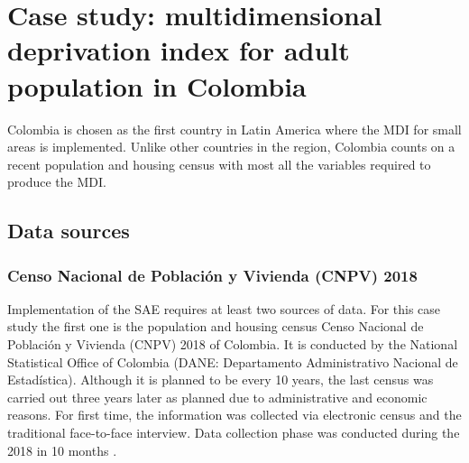 \documentclass[a4paper, 11pt]{article}
\begin{document}





\section{Case study: multidimensional deprivation index for adult population in Colombia}

Colombia is chosen as the first country in Latin America where the MDI for small areas is implemented. Unlike other countries in the region, Colombia counts on a recent population and housing census with most all the variables required to produce the MDI. 



\subsection{Data sources}

\subsubsection{Censo Nacional de Población y Vivienda (CNPV)  2018}
Implementation of the SAE requires at least two sources of data. For this case study the first one is the population and housing census Censo Nacional de Población y Vivienda (CNPV) 2018 of Colombia. It is conducted by the National Statistical Office of Colombia (DANE: Departamento Administrativo Nacional de Estadística). Although it is planned to be every 10 years, the last census was carried out three years later as planned due to administrative and economic reasons. For first time, the information was collected via electronic census and the traditional face-to-face interview. Data collection phase was conducted during the 2018 in 10 months \citep{DANE2019}.
\end{document}
